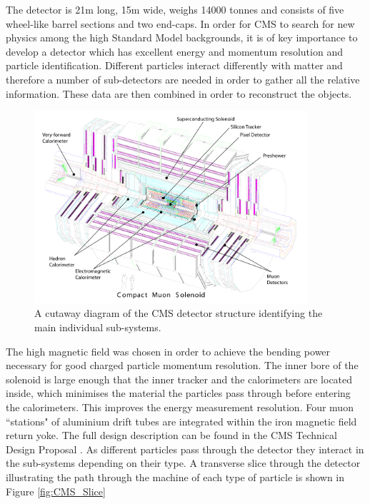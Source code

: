 The detector is 21m long, 15m wide, weighs 14000 tonnes and consists of five wheel-like barrel sections and two end-caps. In order for CMS to search for new physics among the high Standard Model backgrounds, it is of key importance to develop a detector which has excellent energy and momentum resolution and particle identification. Different particles interact differently with matter and therefore a number of sub-detectors are needed in order to gather all the relative information. These data are then combined in order to reconstruct the objects. 

\begin{figure}[htbp]
\centering
\includegraphics[width=0.9\textwidth]{Figures/Detector/CMS_Structure}
\caption{A cutaway diagram of the CMS detector structure identifying the main individual sub-systems.}
\label{fig:CMS_Struct}
\end{figure}

The high magnetic field was chosen in order to achieve the bending power necessary for good charged particle momentum resolution. The inner bore of the solenoid is large enough that the inner tracker and the calorimeters are located inside, which minimises the material the particles pass through before entering the calorimeters. This improves the energy measurement resolution. Four muon ``stations" of aluminium drift tubes are integrated within the iron magnetic field return yoke. The full design description can be found in the CMS Technical Design Proposal \cite{CMSTDP}. As different particles pass through the detector they interact in the sub-systems depending on their type. A transverse slice through the detector illustrating the path through the machine of each type of particle is shown in Figure \ref{fig:CMS_Slice} 





